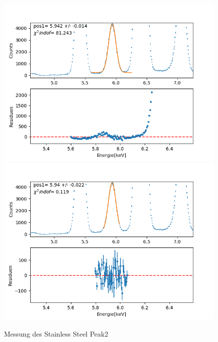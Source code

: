 \documentclass[12pt,a4paper]{article}
\begin{document}
\begin{figure}[H]
\centering
\includegraphics[scale=0.49]{Bilder/roentgen_spektren/stahl/rub2_1.png}
\includegraphics[scale=0.49]{Bilder/roentgen_spektren/stahl/rub2_2.png}
\caption{Messung des Stainless Steel Peak2}
\end{figure}
\end{document}
